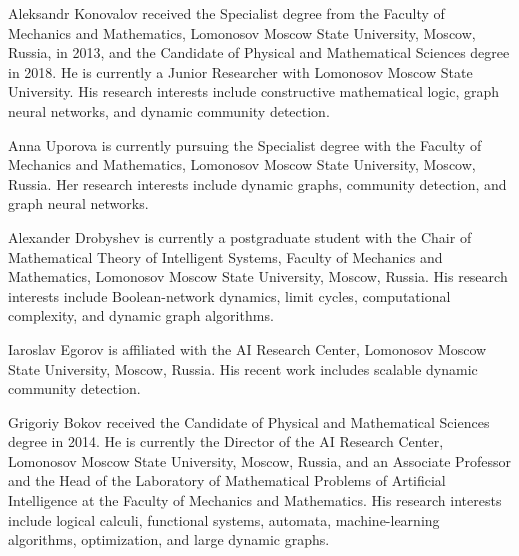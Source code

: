 \documentclass{ieeeaccess}
\begin{document}



\begin{IEEEbiographynophoto}{Aleksandr Konovalov}
received the Specialist degree from the Faculty of Mechanics and Mathematics,
Lomonosov Moscow State University, Moscow, Russia, in 2013, and the Candidate
of Physical and Mathematical Sciences degree in 2018. He is currently a Junior
Researcher with Lomonosov Moscow State University. His research interests
include constructive mathematical logic, graph neural networks, and dynamic
community detection.
\end{IEEEbiographynophoto}

\begin{IEEEbiographynophoto}{Anna Uporova}
is currently pursuing the Specialist degree with the Faculty of Mechanics and
Mathematics, Lomonosov Moscow State University, Moscow, Russia. Her research
interests include dynamic graphs, community detection, and graph neural
networks.
\end{IEEEbiographynophoto}

\begin{IEEEbiographynophoto}{Alexander Drobyshev}
is currently a postgraduate student with the Chair of Mathematical Theory of
Intelligent Systems, Faculty of Mechanics and Mathematics, Lomonosov Moscow
State University, Moscow, Russia. His research interests include
Boolean-network dynamics, limit cycles, computational complexity, and dynamic
graph algorithms.
\end{IEEEbiographynophoto}

\begin{IEEEbiographynophoto}{Iaroslav Egorov}
is affiliated with the AI Research Center, Lomonosov Moscow State University,
Moscow, Russia. His recent work includes scalable dynamic community detection.
\end{IEEEbiographynophoto}

\begin{IEEEbiographynophoto}{Grigoriy Bokov}
received the Candidate of Physical and Mathematical Sciences degree in 2014.
He is currently the Director of the AI Research Center, Lomonosov Moscow State
University, Moscow, Russia, and an Associate Professor and the Head of the
Laboratory of Mathematical Problems of Artificial Intelligence at the Faculty
of Mechanics and Mathematics. His research interests include logical calculi,
functional systems, automata, machine-learning algorithms, optimization, and
large dynamic graphs.
\end{IEEEbiographynophoto}

\EOD
\end{document}
